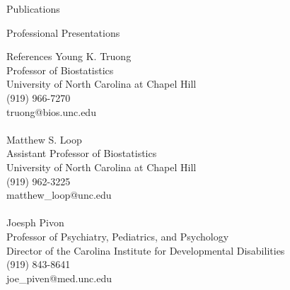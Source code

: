 \documentclass{resume} %
\begin{document}
\begin{rSection}{Publications}

\begin{refsection}[CV.bib]
\nocite{*}
\printbibliography[keyword=Published,omitnumbers=true,title=Published]
\printbibliography[keyword=Accepted,omitnumbers=true,title=Accepted]
\printbibliography[keyword=Submitted,omitnumbers=true,title=Submitted]
\end{refsection}

\end{rSection}

\begin{rSection}{Professional Presentations}

\begin{refsection}
\nocite{*}
\leavevmode\printbibliography[omitnumbers=true,heading=none]
\end{refsection}

\end{rSection}


\begin{rSection}{References} 
Young K. Truong\\
Professor of Biostatistics\\
University of North Carolina at Chapel Hill\\
(919) 966-7270\\
truong@bios.unc.edu\\
\\
Matthew S. Loop\\
Assistant Professor of Biostatistics\\
University of North Carolina at Chapel Hill\\
(919) 962-3225\\
matthew\_loop@unc.edu\\
\\
Joesph Pivon\\
Professor of Psychiatry, Pediatrics, and Psychology\\
Director of the Carolina Institute for Developmental Disabilities\\
(919) 843-8641\\
joe\_piven@med.unc.edu\\

\end{rSection}
\end{document}
